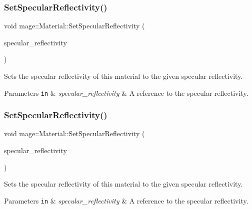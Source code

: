 \subsubsection{\texorpdfstring{Set\+Specular\+Reflectivity()}{SetSpecularReflectivity()}\hspace{0.1cm}{\footnotesize\ttfamily [1/2]}}
{\footnotesize\ttfamily void mage\+::\+Material\+::\+Set\+Specular\+Reflectivity (\begin{DoxyParamCaption}\item[{const \hyperlink{structmage_1_1_r_g_b_spectrum}{R\+G\+B\+Spectrum} \&}]{specular\+\_\+reflectivity }\end{DoxyParamCaption})\hspace{0.3cm}{\ttfamily [noexcept]}}

Sets the specular reflectivity of this material to the given specular reflectivity.


\begin{DoxyParams}[1]{Parameters}
\mbox{\tt in}  & {\em specular\+\_\+reflectivity} & A reference to the specular reflectivity. \\
\hline
\end{DoxyParams}
\hypertarget{structmage_1_1_material_ade7fe7386618bd139e9c43699eba0a20}{}\label{structmage_1_1_material_ade7fe7386618bd139e9c43699eba0a20} 
\subsubsection{\texorpdfstring{Set\+Specular\+Reflectivity()}{SetSpecularReflectivity()}\hspace{0.1cm}{\footnotesize\ttfamily [2/2]}}
{\footnotesize\ttfamily void mage\+::\+Material\+::\+Set\+Specular\+Reflectivity (\begin{DoxyParamCaption}\item[{\hyperlink{structmage_1_1_r_g_b_spectrum}{R\+G\+B\+Spectrum} \&\&}]{specular\+\_\+reflectivity }\end{DoxyParamCaption})\hspace{0.3cm}{\ttfamily [noexcept]}}

Sets the specular reflectivity of this material to the given specular reflectivity.


\begin{DoxyParams}[1]{Parameters}
\mbox{\tt in}  & {\em specular\+\_\+reflectivity} & A reference to the specular reflectivity. \\
\hline
\end{DoxyParams}
\hypertarget{structmage_1_1_material_ae4fb6a048efeed96075e684fddefae26}{}\label{structmage_1_1_material_ae4fb6a048efeed96075e684fddefae26} 
